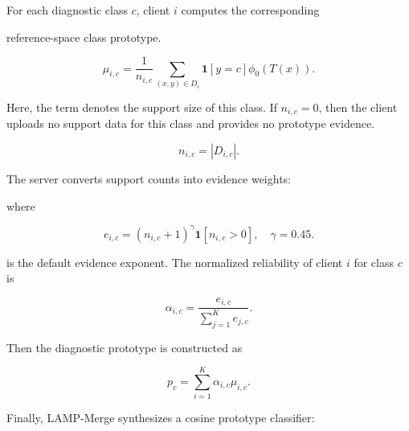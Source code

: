 \documentclass[letterpaper]{article}
\begin{document}
For each diagnostic class $c$, client $i$ computes the corresponding


reference-space class prototype.


\begin{equation}
\mu_{i,c}=\frac{1}{n_{i,c}}\sum_{(x,y)\in D_i}\mathbf{1}[y=c]\phi_0(T(x)).
\end{equation}

Here, the term denotes the support size of this class. If $n_{i,c}=0$, then the client uploads no support data for this class and provides no prototype evidence.

\begin{equation}
n_{i,c}=|D_{i,c}|.
\end{equation}

The server converts support counts into evidence weights:


where

\begin{equation}
e_{i,c}=(n_{i,c}+1)^\gamma \mathbf{1}[n_{i,c}>0],
\quad \gamma=0.45.
\end{equation}

is the default evidence exponent. The normalized reliability of client $i$ for class $c$ is


\begin{equation}
\alpha_{i,c}=\frac{e_{i,c}}{\sum_{j=1}^{K}e_{j,c}}.
\end{equation}

Then the diagnostic prototype is constructed as


\begin{equation}
p_c=\sum_{i=1}^{K}\alpha_{i,c}\mu_{i,c}.
\end{equation}

Finally, LAMP-Merge synthesizes a cosine prototype classifier:
\end{document}
